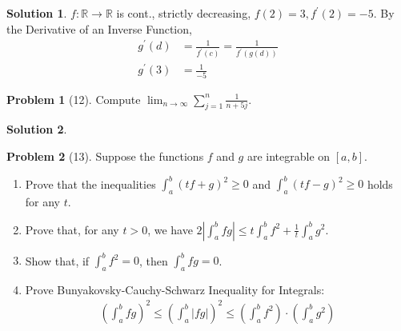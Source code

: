 \documentclass[12pt]{article}
\theoremstyle{definition} %
\newtheorem{solution}{Solution}
\newtheorem{problem}{Problem}
\theoremstyle{plain} %
\begin{document}
\begin{solution}
    $f:\mathbb{{R}}\to \mathbb{{R}}$ is cont., strictly decreasing, $f(2)=3, f^\prime (2)=-5$. By the Derivative of an Inverse Function, 
    \begin{align}
    g^\prime (d)&=\frac{1}{f^\prime (c)}= \frac{1}{f^\prime (g(d))} \label{in} \\[10pt] 
    g^\prime (3) &= \boxed{\frac{1}{-5}}
    \end{align}   
\end{solution}
\begin{problem}[12]
   Compute $\lim_{n \to \infty} \sum_{j=1}^{n} \frac{1}{n+5j}$.  
\end{problem}
\begin{solution}
    
\end{solution}
\begin{problem}[13]
   Suppose the functions $f$ and $g$ are integrable on $[a,b]$. 
   \begin{enumerate}
    \item Prove that the inequalities $\int_{a}^{b} (tf+g)^{2} \geq 0$ and $\int_{a}^{b} (tf-g)^{2} \geq 0$ holds for any $t$.
    \item Prove that, for any $t>0$, we have $2\left\vert \int_{a}^{b} fg \right\vert \leq t\int_{a}^{b} f^{2} +\frac{1}{t}\int_{a}^{b} g^{2}$.
    \item Show that, if $\int_{a}^{b} f^{2} = 0$, then $\int_{a}^{b} fg=0  $.     
    \item Prove Bunyakovsky-Cauchy-Schwarz Inequality for Integrals:
     \begin{align}
        \left( \int_{a}^{b} fg   \right)^{2} \leq \left( \int_{a}^{b} \left\vert fg \right\vert    \right)^{2} \leq \left( \int_{a}^{b} f^{2}   \right) \cdot \left( \int_{a}^{b} g^{2}  \right)
    \end{align}
   \end{enumerate}  
\end{problem}
\end{document}
